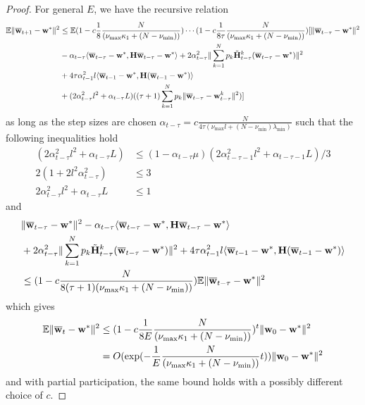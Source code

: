 \begin{proof}
	For general $E$, we have the recursive relation
	\begin{align*}
	\mathbb{E}\|{\overline{\mathbf{w}}}_{t+1}-{\mathbf{w}}^{\ast}\|^{2} & \leq\mathbb{E}(1-c\frac{1}{8}\frac{N}{(\nu_{\max}\kappa_{1}+(N-\nu_{\min}))})\cdots(1-c\frac{1}{8\tau}\frac{N}{(\nu_{\max}\kappa_{1}+(N-\nu_{\min}))})[\|{\overline{\mathbf{w}}}_{t-\tau}-{\mathbf{w}}^{\ast}\|^{2}\\
	& -\alpha_{t-\tau}\langle{\overline{\mathbf{w}}}_{t-\tau}-{\mathbf{w}}^{\ast},{\mathbf{H}}{\overline{\mathbf{w}}}_{t-\tau}-{\mathbf{w}}^{\ast}\rangle+2\alpha_{t-\tau}^{2}\|\sum_{k=1}^{N}p_{k}\tilde{{\mathbf{H}}}_{t-\tau}^{k}({\overline{\mathbf{w}}}_{t-\tau}-{\mathbf{w}}^{\ast})\|^{2}\\
	& +4\tau\alpha_{t-1}^{2}l\langle{\overline{\mathbf{w}}}_{t-1}-{\mathbf{w}}^{\ast},{\mathbf{H}}({\overline{\mathbf{w}}}_{t-1}-{\mathbf{w}}^{\ast})\rangle\\
	& +(2\alpha_{t-\tau}^{2}l^{2}+\alpha_{t-\tau}L)((\tau+1)\sum_{k=1}^{N}p_{k}\|{\overline{\mathbf{w}}}_{t-\tau}-{\mathbf{w}}_{t-\tau}^{k}\|^{2})]
	\end{align*}
	as long as the step sizes are chosen $\alpha_{t-\tau}=c\frac{N}{4\tau(\nu_{\max}l+(N-\nu_{\min})\lambda_{\min})}$
	such that the following inequalities hold 
	\begin{align*}
	(2\alpha_{t-\tau}^{2}l^{2}+\alpha_{t-\tau}L) & \leq(1-\alpha_{t-\tau}\mu)(2\alpha_{t-\tau-1}^{2}l^{2}+\alpha_{t-\tau-1}L)/3\\
	2(1+2l^{2}\alpha_{t-\tau}^{2}) & \leq3\\
	2\alpha_{t-\tau}^{2}l^{2}+\alpha_{t-\tau}L & \leq1
	\end{align*}
	and 
	\begin{align*}
	& \|{\overline{\mathbf{w}}}_{t-\tau}-{\mathbf{w}}^{\ast}\|^{2}-\alpha_{t-\tau}\langle{\overline{\mathbf{w}}}_{t-\tau}-{\mathbf{w}}^{\ast},{\mathbf{H}}{\overline{\mathbf{w}}}_{t-\tau}-{\mathbf{w}}^{\ast}\rangle\\
	& +2\alpha_{t-\tau}^{2}\|\sum_{k=1}^{N}p_{k}\tilde{{\mathbf{H}}}_{t-\tau}^{k}({\overline{\mathbf{w}}}_{t-\tau}-{\mathbf{w}}^{\ast})\|^{2}+4\tau\alpha_{t-1}^{2}l\langle{\overline{\mathbf{w}}}_{t-1}-{\mathbf{w}}^{\ast},{\mathbf{H}}({\overline{\mathbf{w}}}_{t-1}-{\mathbf{w}}^{\ast})\rangle\\
	& \leq(1-c\frac{N}{8(\tau+1)(\nu_{\max}\kappa_{1}+(N-\nu_{\min}))})\mathbb{E}\|{\overline{\mathbf{w}}}_{t-\tau}-{\mathbf{w}}^{\ast}\|^{2}
	\end{align*}
	which gives 
	\begin{align*}
	\mathbb{E}\|{\overline{\mathbf{w}}}_{t}-{\mathbf{w}}^{\ast}\|^{2} & \leq(1-c\frac{1}{8E}\frac{N}{(\nu_{\max}\kappa_{1}+(N-\nu_{\min}))})^{t}\|{\mathbf{w}}_{0}-{\mathbf{w}}^{\ast}\|^{2}\\
	& =O(\exp(-\frac{1}{E}\frac{N}{(\nu_{\max}\kappa_{1}+(N-\nu_{\min}))}t))\|{\mathbf{w}}_{0}-{\mathbf{w}}^{\ast}\|^{2}
	\end{align*}
	and with partial participation, the same bound holds with a possibly
	different choice of $c$. 
\end{proof}
